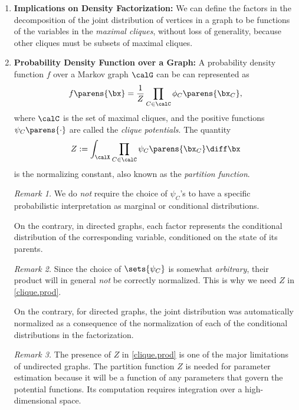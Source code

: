 \documentclass[12pt]{article}
\begin{document}
\begin{enumerate}[label=\textbf{\arabic*.}]
	\item \textbf{Implications on Density Factorization:} We can define the factors in the decomposition of the joint distribution of vertices in a graph to be functions of the variables in the \textit{maximal cliques}, without loss of generality, because other cliques must be subsets of maximal cliques. 
	
	\item \textbf{Probability Density Function over a Graph:} A probability density function $f$ over a Markov graph $\calG$ can be can represented as
	\begin{align}\label{clique.prod}
		f \parens{\bx} = \frac{1}{Z} \prod_{C \in \calC} \phi_C \parens{\bx_C}, 
	\end{align}
	where $\calC$ is the set of maximal cliques, and the positive functions $\psi_C \parens{\cdot}$ are called the \textit{clique potentials}. The quantity 
	\begin{align}\label{eq-partition-fun}
		Z := \int_{\calX} \prod_{C \in \calC} \psi_C \parens{\bx_C} \diff \bx 
	\end{align}
	is the normalizing constant, also known as the \textit{partition function}. 
	
	
	\textit{Remark 1.} We do \emph{not} require the choice of $\psi_C$'s to have a specific probabilistic interpretation as marginal or conditional distributions. 
		
	On the contrary, in directed graphs, each factor represents the conditional distribution of the corresponding variable, conditioned on the state of its parents. 
	
	\textit{Remark 2.} Since the choice of $\sets{\psi_C}$ is somewhat \textit{arbitrary}, their product will in general \emph{not} be correctly normalized. This is why we need $Z$ in \eqref{clique.prod}. 
		
	On the contrary, for directed graphs, the joint distribution was automatically normalized as a consequence of the normalization of each of the conditional distributions in the factorization. 
	
	\textit{Remark 3.} The presence of $Z$ in \eqref{clique.prod} is one of the major limitations of undirected graphs. The partition function $Z$ is needed for parameter estimation because it will be a function of any parameters that govern the potential functions. Its computation requires integration over a high-dimensional space. 
	

\end{enumerate}
\end{document}
